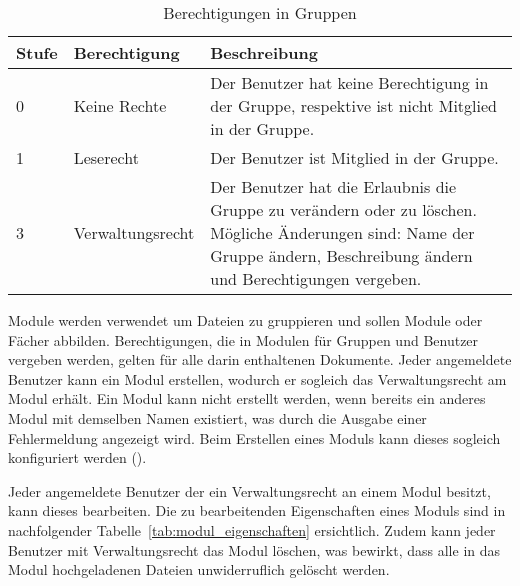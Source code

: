 \begin{table}[H]
\begin{tabularx}{\textwidth}{|l|l|X|} \hline
\textbf{Stufe} & \textbf{Berechtigung}     & \textbf{Beschreibung} \\ \hline
0     & Keine Rechte     & Der Benutzer hat keine Berechtigung in der Gruppe, respektive ist nicht Mitglied in der Gruppe.\\ \hline
1     & Leserecht        & Der Benutzer ist Mitglied in der Gruppe.\\ \hline
3     & Verwaltungsrecht & Der Benutzer hat die Erlaubnis die Gruppe zu verändern oder zu löschen. Mögliche Änderungen sind: Name der Gruppe ändern, Beschreibung ändern und Berechtigungen vergeben.\\ \hline
\end{tabularx}
\caption{Berechtigungen in Gruppen}
\label{tab:gruppe_rechte}
\end{table}

Module werden verwendet um Dateien zu gruppieren und sollen Module oder Fächer abbilden. Berechtigungen, die in Modulen für Gruppen und Benutzer vergeben werden, gelten für alle darin enthaltenen Dokumente.
Jeder angemeldete Benutzer kann ein Modul erstellen, wodurch er sogleich das Verwaltungsrecht am Modul erhält. Ein Modul kann nicht erstellt werden, wenn bereits ein anderes Modul mit demselben Namen existiert, was durch die Ausgabe einer Fehlermeldung angezeigt wird.
Beim Erstellen eines Moduls kann dieses sogleich konfiguriert werden ().

Jeder angemeldete Benutzer der ein Verwaltungsrecht an einem Modul besitzt, kann dieses bearbeiten. Die zu bearbeitenden Eigenschaften eines Moduls sind in nachfolgender Tabelle~\ref{tab:modul_eigenschaften} ersichtlich. Zudem kann jeder Benutzer mit Verwaltungsrecht das Modul löschen, was bewirkt, dass alle in das Modul hochgeladenen Dateien unwiderruflich gelöscht werden.

